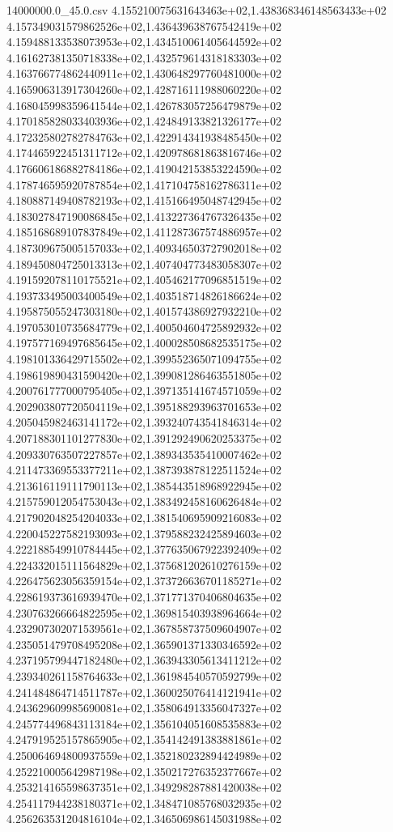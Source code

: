 \begin{filecontents*}{14000000.0_45.0.csv}
4.155210075631643463e+02,1.438368346148563433e+02
4.157349031579862526e+02,1.436439638767542419e+02
4.159488133538073953e+02,1.434510061405644592e+02
4.161627381350718338e+02,1.432579614318183303e+02
4.163766774862440911e+02,1.430648297760481000e+02
4.165906313917304260e+02,1.428716111988060220e+02
4.168045998359641544e+02,1.426783057256479879e+02
4.170185828033403936e+02,1.424849133821326177e+02
4.172325802782784763e+02,1.422914341938485450e+02
4.174465922451311712e+02,1.420978681863816746e+02
4.176606186882784186e+02,1.419042153853224590e+02
4.178746595920787854e+02,1.417104758162786311e+02
4.180887149408782193e+02,1.415166495048742945e+02
4.183027847190086845e+02,1.413227364767326435e+02
4.185168689107837849e+02,1.411287367574886957e+02
4.187309675005157033e+02,1.409346503727902018e+02
4.189450804725013313e+02,1.407404773483058307e+02
4.191592078110175521e+02,1.405462177096851519e+02
4.193733495003400549e+02,1.403518714826186624e+02
4.195875055247303180e+02,1.401574386927932210e+02
4.197053010735684779e+02,1.400504604725892932e+02
4.197577169497685645e+02,1.400028508682535175e+02
4.198101336429715502e+02,1.399552365071094755e+02
4.198619890431590420e+02,1.399081286463551805e+02
4.200761777000795405e+02,1.397135141674571059e+02
4.202903807720504119e+02,1.395188293963701653e+02
4.205045982463141172e+02,1.393240743541846314e+02
4.207188301101277830e+02,1.391292490620253375e+02
4.209330763507227857e+02,1.389343535410007462e+02
4.211473369553377211e+02,1.387393878122511524e+02
4.213616119111790113e+02,1.385443518968922945e+02
4.215759012054753043e+02,1.383492458160626484e+02
4.217902048254204033e+02,1.381540695909216083e+02
4.220045227582193093e+02,1.379588232425894603e+02
4.222188549910784445e+02,1.377635067922392409e+02
4.224332015111564829e+02,1.375681202610276159e+02
4.226475623056359154e+02,1.373726636701185271e+02
4.228619373616939470e+02,1.371771370406804635e+02
4.230763266664822595e+02,1.369815403938964664e+02
4.232907302071539561e+02,1.367858737509604907e+02
4.235051479708495208e+02,1.365901371330346592e+02
4.237195799447182480e+02,1.363943305613411212e+02
4.239340261158764633e+02,1.361984540570592799e+02
4.241484864714511787e+02,1.360025076414121941e+02
4.243629609985690081e+02,1.358064913356047327e+02
4.245774496843113184e+02,1.356104051608535883e+02
4.247919525157865905e+02,1.354142491383881861e+02
4.250064694800937559e+02,1.352180232894424989e+02
4.252210005642987198e+02,1.350217276352377667e+02
4.253214165598637351e+02,1.349298287881420038e+02
4.254117944238180371e+02,1.348471085768032935e+02
4.256263531204816104e+02,1.346506986145031988e+02

\end{filecontents*}
